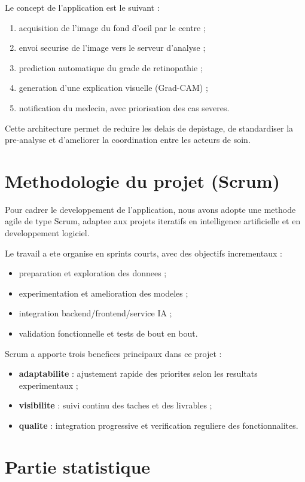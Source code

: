 Le concept de l'application est le suivant :
\begin{enumerate}
    \item acquisition de l'image du fond d'oeil par le centre ;
    \item envoi securise de l'image vers le serveur d'analyse ;
    \item prediction automatique du grade de retinopathie ;
    \item generation d'une explication visuelle (Grad-CAM) ;
    \item notification du medecin, avec priorisation des cas severes.
\end{enumerate}

Cette architecture permet de reduire les delais de depistage,
de standardiser la pre-analyse et d'ameliorer la coordination entre les acteurs de soin.

\section{Methodologie du projet (Scrum)}
Pour cadrer le developpement de l'application, nous avons adopte une methode agile de type Scrum,
adaptee aux projets iteratifs en intelligence artificielle et en developpement logiciel.

Le travail a ete organise en sprints courts, avec des objectifs incrementaux :
\begin{itemize}
    \item preparation et exploration des donnees ;
    \item experimentation et amelioration des modeles ;
    \item integration backend/frontend/service IA ;
    \item validation fonctionnelle et tests de bout en bout.
\end{itemize}

Scrum a apporte trois benefices principaux dans ce projet :
\begin{itemize}
    \item \textbf{adaptabilite} : ajustement rapide des priorites selon les resultats experimentaux ;
    \item \textbf{visibilite} : suivi continu des taches et des livrables ;
    \item \textbf{qualite} : integration progressive et verification reguliere des fonctionnalites.
\end{itemize}

\section{Partie statistique}

